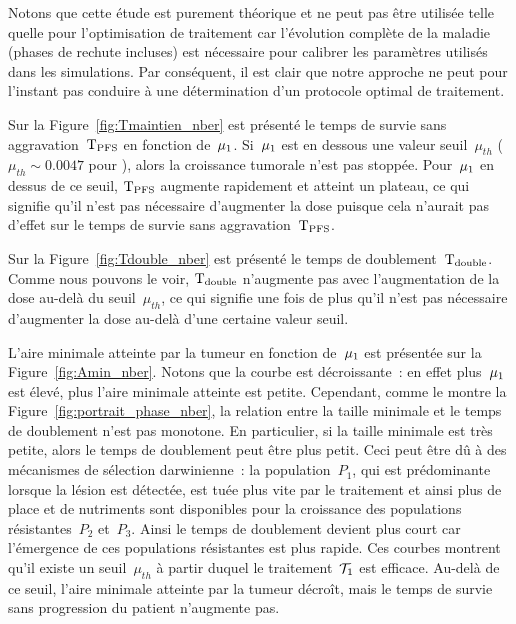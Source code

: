 \documentclass[main.tex]{subfiles}
\begin{document}
Notons que cette étude est purement théorique et ne peut pas être utilisée telle quelle pour l'optimisation de traitement car l'évolution complète de la maladie (phases de rechute incluses) est nécessaire pour calibrer les paramètres utilisés dans les simulations. Par conséquent, il est clair que notre approche ne peut pour l'instant pas conduire à une détermination d'un protocole optimal de traitement. 


Sur la Figure~\ref{fig:Tmaintien_nber} est présenté le temps de survie sans aggravation~${\rm T_{PFS}}$ en fonction de~$\mu_1$. 
Si~$\mu_1$ est en dessous une valeur seuil~$\mu_{th}$ ($\mu_{th}\sim 0.0047$ pour \Nber), alors la croissance tumorale n'est pas stoppée.  
Pour~$\mu_1$ en dessus de ce seuil, ${\rm T_{PFS}}$ augmente rapidement et atteint un plateau, ce qui signifie qu'il n'est pas nécessaire d'augmenter la dose puisque cela n'aurait pas d'effet sur  le temps de survie sans aggravation~${\rm T_{PFS}}$.

Sur la Figure~\ref{fig:Tdouble_nber} est présenté le temps de doublement~${\rm T_{double}}$. 
Comme nous pouvons le voir, ${\rm T_{double}}$ n'augmente pas avec l'augmentation de la dose au-delà du seuil~$\mu_{th}$, ce qui signifie une fois de plus qu'il n'est pas nécessaire d'augmenter la dose au-delà d'une certaine valeur seuil.


L'aire minimale atteinte par la tumeur en fonction de~$\mu_1$ est présentée sur la Figure~\ref{fig:Amin_nber}. Notons que la courbe est décroissante~: en effet plus~$\mu_1$ est élevé, plus l'aire minimale atteinte est petite. Cependant, comme le montre la  Figure~\ref{fig:portrait_phase_nber}, la relation entre la taille minimale et le temps de doublement n'est pas monotone. En particulier, si la taille minimale est très petite, alors le temps de doublement peut être plus petit.  
Ceci peut être dû à des mécanismes de sélection darwinienne~: 
la population~$P_1$, qui est prédominante lorsque la lésion est détectée, est tuée plus vite par le traitement et ainsi plus de place et de nutriments sont disponibles pour la croissance des populations résistantes~$P_2$ et~$P_3$. Ainsi le temps de doublement devient plus court car l'émergence de ces populations résistantes est plus rapide. 
Ces courbes montrent qu'il existe un seuil~$\mu_{th}$ à partir duquel le traitement~$\mathcal{T}_1$ est efficace. Au-delà de ce seuil, l'aire minimale atteinte par la tumeur décroît, mais le temps de survie sans progression du patient n'augmente pas.
\end{document}
